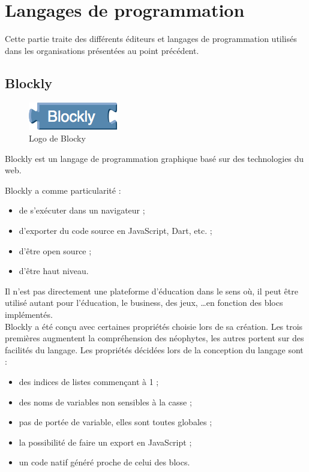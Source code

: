 \section{Langages de programmation}
\label{langages}
Cette partie traite des différents éditeurs et langages de programmation utilisés dans les organisations présentées au point précédent.

\subsection{Blockly}
\label{blockly}

\begin{figure}[!ht]
  \begin{center}
    \includegraphics[scale=0.5]{content/5-related_work/images/blocky}
    \caption{Logo de Blocky}
    \label{fig:blocky}
  \end{center}
\end{figure}
Blockly \cite{blockly} est un langage de programmation graphique basé sur des technologies du web.

Blockly a comme particularité :
\begin{itemize}
\item de s'exécuter dans un navigateur ;
\item d'exporter du code source en JavaScript, Dart, etc. ;
\item d'être open source ;
\item d'être haut niveau.
\end{itemize}

Il n'est pas directement une plateforme d'éducation dans le sens où, il peut être utilisé autant pour l'éducation, le business, des jeux, \ldots en fonction des \glspl{bloc} implémentés.\\

Blockly a été conçu avec certaines propriétés choisie lors de sa création. Les trois premières augmentent la compréhension des néophytes, les autres portent sur des facilités du langage. Les propriétés décidées lors de la conception du langage sont \cite{blockly-lang} :

\begin{itemize}
  \item des indices de listes commençant à 1 ;
  \item des noms de variables non sensibles à la casse ;
  \item pas de portée de variable, elles sont toutes globales ;
  \item la possibilité de faire un export en JavaScript ;
  \item un code natif généré proche de celui des \glspl{bloc}.
\end{itemize}

